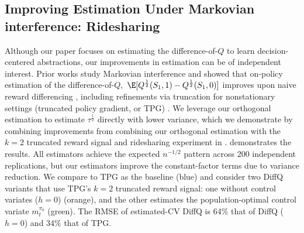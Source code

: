 \documentclass[opre,nonblindrev]{informs4}
\newenvironment{revision}{\begingroup\color{revisionblue}\ignorespaces}{\endgroup}
\newcommand{\blipadv}{\tau}
\begin{document}
\begin{revision}
\subsection{Improving Estimation Under Markovian interference: Ridesharing}
\label{app:tpg-results}

Although our paper focuses on estimating the difference-of-$Q$ to learn decision-centered abstractions, our improvements in estimation can be of independent interest. Prior works study Markovian interference and showed that on-policy estimation of the difference-of-$Q,$ $\E[Q^{\frac{1}{2}}(S_1,1)-Q^{\frac{1}{2}}(S_1,0)]$ improves upon naive reward differencing \citep{farias2022markovian}, including refinements via truncation for nonstationary settings (truncated policy gradient, or TPG) \citep{johari2025estimation}. We leverage our orthogonal estimation to estimate $\blipadv^{\frac 12}$ directly with lower variance, which we demonstrate by combining improvements from combining our orthogonal estimation with the $k=2$ truncated reward signal and ridesharing experiment in \citet{johari2025estimation}.  demonstrates the results. All estimators achieve the expected
\(n^{-1/2}\) pattern across 200 independent replications, but our estimators improve the constant-factor terms due to variance reduction. We compare to TPG as the baseline (blue) and  consider two
DiffQ variants that use TPG's \(k=2\) truncated reward signal: one without control variates (\(h=0\)) (orange), and the other estimates the population-optimal
control variate \(m_t^{\pi_b}\) (green). The RMSE of estimated-CV DiffQ is 64\% that of DiffQ (\(h=0\))
and 34\% that of TPG.


\end{revision}
\end{document}
